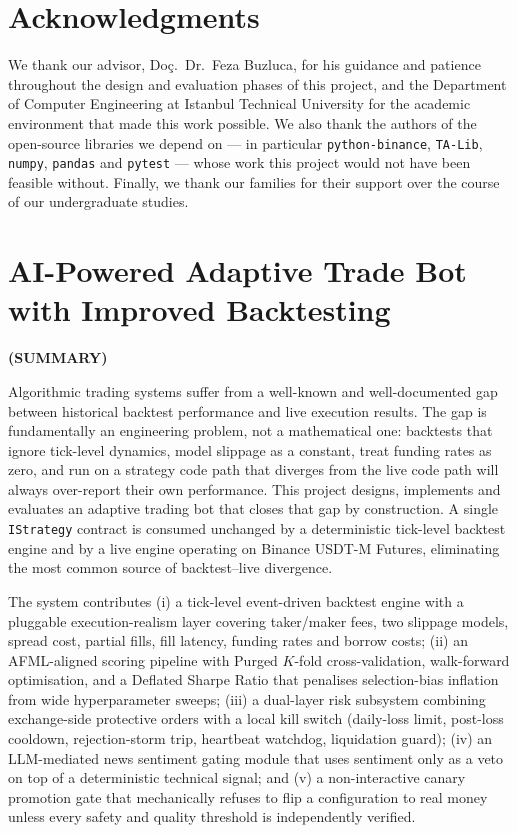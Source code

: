 \documentclass[a4paper, 12pt, titlepage]{article}
\newcommand{\thetitle}{AI-Powered Adaptive Trade Bot with Improved Backtesting}
\begin{document}
\newpage
\section*{Acknowledgments}
We thank our advisor, Doç.\ Dr.\ Feza Buzluca, for his guidance and
patience throughout the design and evaluation phases of this project,
and the Department of Computer Engineering at Istanbul Technical
University for the academic environment that made this work possible.
We also thank the authors of the open-source libraries we depend on
--- in particular \texttt{python-binance}, \texttt{TA-Lib},
\texttt{numpy}, \texttt{pandas} and \texttt{pytest} --- whose work
this project would not have been feasible without. Finally, we thank
our families for their support over the course of our undergraduate
studies.

\newpage
\section*{\centering\thetitle}
\centerline{\fontsize{16pt}{21.6pt}\sffamily\bfseries (SUMMARY)}

Algorithmic trading systems suffer from a well-known and well-documented
gap between historical backtest performance and live execution results.
The gap is fundamentally an engineering problem, not a mathematical one:
backtests that ignore tick-level dynamics, model slippage as a constant,
treat funding rates as zero, and run on a strategy code path that
diverges from the live code path will always over-report their own
performance. This project designs, implements and evaluates an
adaptive trading bot that closes that gap by construction. A single
\texttt{IStrategy} contract is consumed unchanged by a deterministic
tick-level backtest engine and by a live engine operating on Binance
USDT-M Futures, eliminating the most common source of backtest--live
divergence.

The system contributes (i) a tick-level event-driven backtest engine
with a pluggable execution-realism layer covering taker/maker fees,
two slippage models, spread cost, partial fills, fill latency,
funding rates and borrow costs; (ii) an AFML-aligned scoring pipeline
with Purged $K$-fold cross-validation, walk-forward optimisation, and
a Deflated Sharpe Ratio that penalises selection-bias inflation from
wide hyperparameter sweeps; (iii) a dual-layer risk subsystem
combining exchange-side protective orders with a local kill switch
(daily-loss limit, post-loss cooldown, rejection-storm trip,
heartbeat watchdog, liquidation guard); (iv) an LLM-mediated news
sentiment gating module that uses sentiment only as a veto on top of
a deterministic technical signal; and (v) a non-interactive canary
promotion gate that mechanically refuses to flip a configuration to
real money unless every safety and quality threshold is independently
verified.
\end{document}
